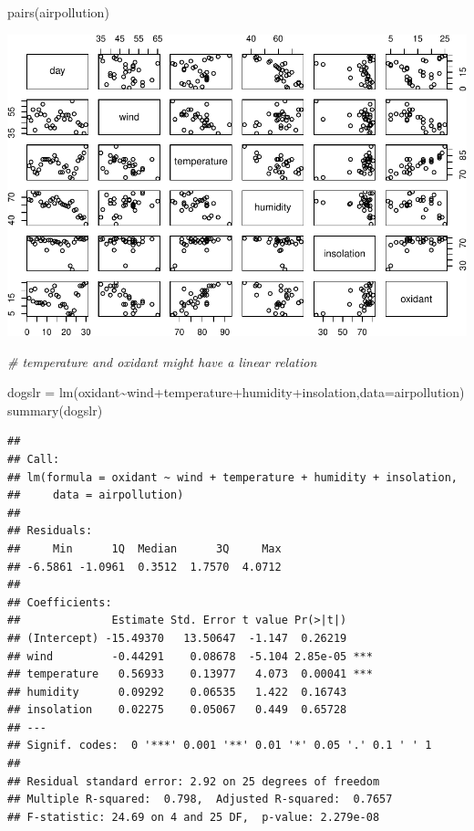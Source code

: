 \documentclass[
]{article}
\newenvironment{Shaded}{\begin{snugshade}}{\end{snugshade}}
\newcommand{\AttributeTok}[1]{\textcolor[rgb]{0.77,0.63,0.00}{#1}}
\newcommand{\CommentTok}[1]{\textcolor[rgb]{0.56,0.35,0.01}{\textit{#1}}}
\newcommand{\FunctionTok}[1]{\textcolor[rgb]{0.00,0.00,0.00}{#1}}
\newcommand{\NormalTok}[1]{#1}
\newcommand{\OtherTok}[1]{\textcolor[rgb]{0.56,0.35,0.01}{#1}}
\newcommand{\SpecialCharTok}[1]{\textcolor[rgb]{0.00,0.00,0.00}{#1}}
\begin{document}
\begin{Shaded}
\begin{Highlighting}[]
\FunctionTok{pairs}\NormalTok{(airpollution)}
\end{Highlighting}
\end{Shaded}

\includegraphics{Assignment2_complete_files/figure-latex/unnamed-chunk-5-1.pdf}

\begin{Shaded}
\begin{Highlighting}[]
\CommentTok{\# temperature and oxidant might have a linear relation}
\end{Highlighting}
\end{Shaded}

\begin{Shaded}
\begin{Highlighting}[]
\NormalTok{dogslr }\OtherTok{=} \FunctionTok{lm}\NormalTok{(oxidant}\SpecialCharTok{\textasciitilde{}}\NormalTok{wind}\SpecialCharTok{+}\NormalTok{temperature}\SpecialCharTok{+}\NormalTok{humidity}\SpecialCharTok{+}\NormalTok{insolation,}\AttributeTok{data=}\NormalTok{airpollution)}
\FunctionTok{summary}\NormalTok{(dogslr)}
\end{Highlighting}
\end{Shaded}

\begin{verbatim}
## 
## Call:
## lm(formula = oxidant ~ wind + temperature + humidity + insolation, 
##     data = airpollution)
## 
## Residuals:
##     Min      1Q  Median      3Q     Max 
## -6.5861 -1.0961  0.3512  1.7570  4.0712 
## 
## Coefficients:
##              Estimate Std. Error t value Pr(>|t|)    
## (Intercept) -15.49370   13.50647  -1.147  0.26219    
## wind         -0.44291    0.08678  -5.104 2.85e-05 ***
## temperature   0.56933    0.13977   4.073  0.00041 ***
## humidity      0.09292    0.06535   1.422  0.16743    
## insolation    0.02275    0.05067   0.449  0.65728    
## ---
## Signif. codes:  0 '***' 0.001 '**' 0.01 '*' 0.05 '.' 0.1 ' ' 1
## 
## Residual standard error: 2.92 on 25 degrees of freedom
## Multiple R-squared:  0.798,  Adjusted R-squared:  0.7657 
## F-statistic: 24.69 on 4 and 25 DF,  p-value: 2.279e-08
\end{verbatim}
\end{document}
